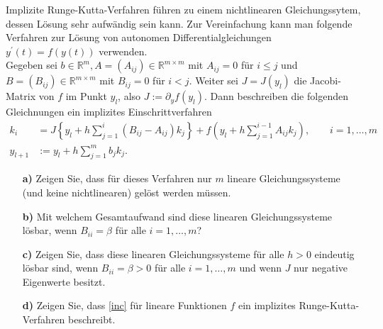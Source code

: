 \begin{exercise}
Implizite Runge-Kutta-Verfahren führen zu einem nichtlinearen Gleichungssytem,
dessen Lösung sehr aufwändig sein kann. Zur Vereinfachung kann man folgende
Verfahren zur Lösung von autonomen Differentialgleichungen $y^{\prime}(t) = f(y(t))$
verwenden. \\
Gegeben sei $b \in \mathbb{R}^m, A = (A_{ij}) \in \mathbb{R}^{m \times m}$ mit
$A_{ij} = 0$ für $i \leq j$ und $B = (B_{ij}) \in \mathbb{R}^{m \times m}$ mit
$B_{ij} = 0$ für $i < j$. Weiter sei $J = J(y_l)$ die Jacobi-Matrix von $f$
im Punkt $y_l$, also
$J := \partial_y f(y_l)$. Dann beschreiben die folgenden Gleichnungen ein implizites
Einschrittverfahren
\begin{align} \label{inc}
  k_i &= J\left\{y_l + h\sum_{j=1}^i(B_{ij} - A_{ij})k_j\right\} + f\left(y_l +
  h\sum_{j=1}^{i-1}A_{ij}k_j\right), \qquad i = 1,\dots,m \\
  y_{l+1} &:= y_l + h\sum_{j=1}^m b_jk_j.
\end{align}
\begin{itemize}
  \item [\textbf{a)}] Zeigen Sie, dass für dieses Verfahren nur $m$ lineare
  Gleichungssysteme (und keine nichtlinearen) gelöst werden müssen.
  \item [\textbf{b)}] Mit welchem Gesamtaufwand sind diese linearen Gleichungssysteme
  lösbar, wenn $B_{ii} = \beta$ für alle $i = 1,\dots,m$?
  \item [\textbf{c)}] Zeigen Sie, dass diese linearen Gleichungssysteme für alle
  $h > 0$ eindeutig lösbar sind, wenn $B_{ii} = \beta > 0$ für alle $i = 1,\dots,m$
  und wenn $J$ nur negative Eigenwerte besitzt.
  \item [\textbf{d)}] Zeigen Sie, dass \eqref{inc} für lineare Funktionen $f$ ein
  implizites Runge-Kutta-Verfahren beschreibt.
\end{itemize}
\end{exercise}
